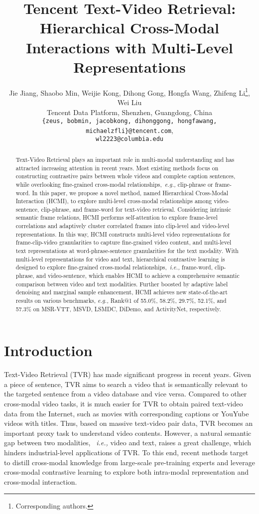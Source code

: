 \documentclass{article}
\title{Tencent Text-Video Retrieval: Hierarchical Cross-Modal Interactions with Multi-Level Representations}
\author{Jie Jiang, Shaobo Min, Weijie Kong, Dihong Gong, Hongfa Wang, Zhifeng Li\thanks{Corresponding authors.}, Wei Liu\footnotemark[1]\\
Tencent Data Platform, Shenzhen, Guangdong, China\\
{\tt\small \{zeus, bobmin, jacobkong, dihonggong, hongfawang, michaelzfli\}@tencent.com}, \\
{\tt\small wl2223@columbia.edu} 
}
\begin{document}
	
	\maketitle
	
\begin{abstract}
	Text-Video Retrieval plays an important role in multi-modal understanding and has attracted increasing attention in recent years.
	Most existing methods focus on constructing contrastive pairs between whole videos and complete caption sentences, while overlooking fine-grained cross-modal relationships,~\emph{e.g.,} clip-phrase or frame-word.
	In this paper, we propose a novel method, named Hierarchical Cross-Modal Interaction (HCMI), to explore multi-level cross-modal relationships among video-sentence, clip-phrase, and frame-word for text-video retrieval.
	Considering intrinsic semantic frame relations, HCMI performs self-attention to explore frame-level correlations and adaptively cluster correlated frames into clip-level and video-level representations.
In this way, HCMI constructs multi-level video representations for frame-clip-video granularities to capture fine-grained video content, and multi-level text representations at word-phrase-sentence granularities for the text modality.
	With multi-level representations for video and text, hierarchical contrastive learning is designed to explore fine-grained cross-modal relationships,~\emph{i.e.,} frame-word, clip-phrase, and video-sentence, which enables HCMI to achieve a comprehensive semantic comparison between video and text modalities.
	Further boosted by adaptive label denoising and marginal sample enhancement, HCMI achieves new state-of-the-art results on various benchmarks, \emph{e.g.,} Rank@1 of 55.0\%, 58.2\%, 29.7\%, 52.1\%, and 57.3\% on MSR-VTT, MSVD, LSMDC, DiDemo, and ActivityNet, respectively.

	
\end{abstract}



\section{Introduction}
Text-Video Retrieval (TVR) \cite{luo2021clip4clip,cheng2021improving,gao2021clip2tv,lei2021less,wang2022disentangled,bain2021frozen,xu2021videoclip} has made significant progress in recent years. 
Given a piece of sentence, TVR aims to search a video that is semantically relevant to the targeted sentence from a video database and vice versa.
Compared to other cross-modal video tasks, it is much easier for TVR to obtain paired text-video data from the Internet, such as movies with corresponding captions or YouYube videos with titles.
Thus, based on massive text-video pair data, TVR becomes an important proxy task to understand video contents.
However, a natural semantic gap between two modalities, ~\emph{i.e.,} video and text, raises a great challenge, which hinders industrial-level applications of TVR.
To this end, recent methods target to distill cross-modal knowledge from large-scale pre-training experts \cite{li2020oscar,huang2020pixel,li2021align,rouditchenko2020avlnet} and leverage cross-modal contrastive learning to explore both intra-modal representation and cross-modal interaction.
\end{document}
